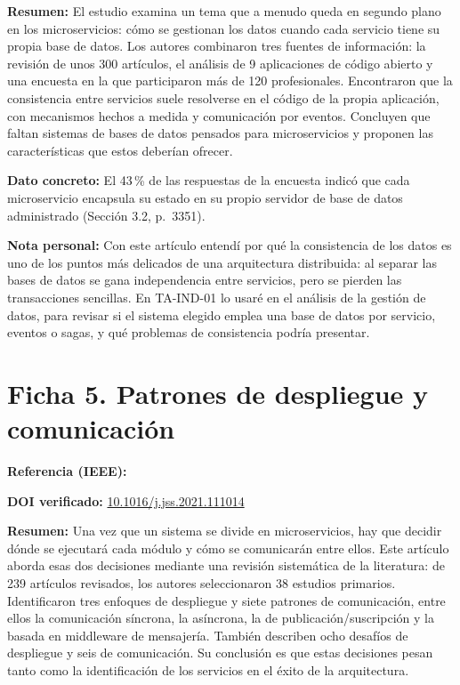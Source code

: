 \documentclass[11pt,a4paper]{article}
\newcommand{\campo}[1]{\par\textbf{#1}\enspace}
\begin{document}
\campo{Resumen:} El estudio examina un tema que a menudo queda en segundo plano en los microservicios: cómo se gestionan los datos cuando cada servicio tiene su propia base de datos. Los autores combinaron tres fuentes de información: la revisión de unos 300 artículos, el análisis de 9 aplicaciones de código abierto y una encuesta en la que participaron más de 120 profesionales. Encontraron que la consistencia entre servicios suele resolverse en el código de la propia aplicación, con mecanismos hechos a medida y comunicación por eventos. Concluyen que faltan sistemas de bases de datos pensados para microservicios y proponen las características que estos deberían ofrecer.

\campo{Dato concreto:} El 43\,\% de las respuestas de la encuesta indicó que cada microservicio encapsula su estado en su propio servidor de base de datos administrado (Sección 3.2, p.~3351).

\campo{Nota personal:} Con este artículo entendí por qué la consistencia de los datos es uno de los puntos más delicados de una arquitectura distribuida: al separar las bases de datos se gana independencia entre servicios, pero se pierden las transacciones sencillas. En TA-IND-01 lo usaré en el análisis de la gestión de datos, para revisar si el sistema elegido emplea una base de datos por servicio, eventos o sagas, y qué problemas de consistencia podría presentar.

\section*{Ficha 5. Patrones de despliegue y comunicación}

\campo{Referencia (IEEE):} 

\campo{DOI verificado:} \href{https://doi.org/10.1016/j.jss.2021.111014}{10.1016/j.jss.2021.111014}

\campo{Resumen:} Una vez que un sistema se divide en microservicios, hay que decidir dónde se ejecutará cada módulo y cómo se comunicarán entre ellos. Este artículo aborda esas dos decisiones mediante una revisión sistemática de la literatura: de 239 artículos revisados, los autores seleccionaron 38 estudios primarios. Identificaron tres enfoques de despliegue y siete patrones de comunicación, entre ellos la comunicación síncrona, la asíncrona, la de publicación/suscripción y la basada en middleware de mensajería. También describen ocho desafíos de despliegue y seis de comunicación. Su conclusión es que estas decisiones pesan tanto como la identificación de los servicios en el éxito de la arquitectura.
\end{document}
